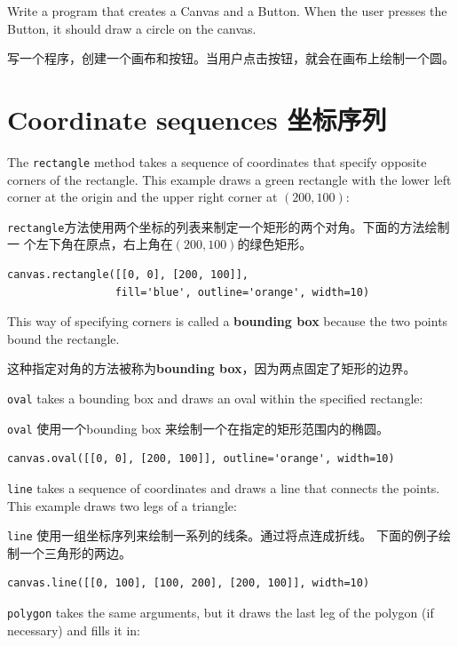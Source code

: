 \documentclass[10pt]{book}
\begin{document}
\begin{CJK}{UTF8}{gbsn}
\begin{exercise}
Write a program that creates a Canvas and a Button.  When the
user presses the Button, it should draw a circle on the canvas.

写一个程序，创建一个画布和按钮。当用户点击按钮，就会在画布上绘制一个圆。

\end{exercise}


\section{Coordinate sequences 坐标序列}

The {\tt rectangle} method takes a sequence of coordinates that
specify opposite corners of the rectangle.  This example
draws a green rectangle with the lower left corner at the origin
and the upper right corner at $(200,100)$:

{\tt rectangle}方法使用两个坐标的列表来制定一个矩形的两个对角。下面的方法绘制一
个左下角在原点，右上角在$(200,100)$的绿色矩形。

\begin{verbatim}
canvas.rectangle([[0, 0], [200, 100]], 
                 fill='blue', outline='orange', width=10)
\end{verbatim}
%
This way of specifying corners is called
a {\bf bounding box} because the two points
bound the rectangle.

这种指定对角的方法被称为{\bf bounding box}，因为两点固定了矩形的边界。

{\tt oval} takes a bounding box and draws an oval
within the specified rectangle:

{\tt oval} 使用一个bounding box 来绘制一个在指定的矩形范围内的椭圆。

\begin{verbatim}
canvas.oval([[0, 0], [200, 100]], outline='orange', width=10)
\end{verbatim}
%
{\tt line} takes a sequence of coordinates and draws
a line that connects the points.  This example draws two legs
of a triangle:

{\tt line} 使用一组坐标序列来绘制一系列的线条。通过将点连成折线。
下面的例子绘制一个三角形的两边。

\begin{verbatim}
canvas.line([[0, 100], [100, 200], [200, 100]], width=10)
\end{verbatim}
%
{\tt polygon} takes the same arguments, but it draws the last
leg of the polygon (if necessary) and fills it in:


\end{CJK}
\end{document}
